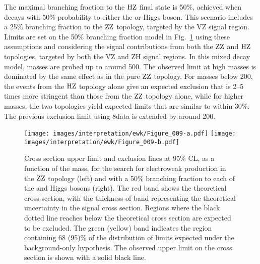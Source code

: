 The maximal branching fraction to the $\mathrm{H}\mathrm{Z}$ final state is 50\%, achieved when \firstchi decays with 50\% probability to either the \PZ or Higgs boson.
This scenario includes a 25\% branching fraction to the $\mathrm{Z}\mathrm{Z}$ topology, targeted by the VZ signal region.
Limits are set on the 50\% branching fraction model in Fig.~\ref{fig:LimitTChiZZHZ} using these assumptions and considering the signal contributions from both the $\mathrm{Z}\mathrm{Z}$ and $\mathrm{H}\mathrm{Z}$ topologies, targeted by both the VZ and ZH signal regions.
In this mixed decay model, \firstchi masses are probed up to around 500\GeV.
The observed limit at high masses is dominated by the same effect as in the pure $\mathrm{Z}\mathrm{Z}$ topology.
For masses below 200\GeV, the events from the $\mathrm{H}\mathrm{Z}$ topology alone give an expected exclusion that is 2--5 times more stringent than those from the $\mathrm{Z}\mathrm{Z}$ topology alone, while for higher masses, the two topologies yield expected limits that are similar to within 30\%.
The previous exclusion limit using 8\TeV data is extended by around 200\GeV.
\begin{figure}
\centering
\texttt{[image: images/interpretation/ewk/Figure\_009-a.pdf]}
\texttt{[image: images/interpretation/ewk/Figure\_009-b.pdf]}
\caption{Cross section upper limit and exclusion lines at 95\% CL, as a function of the \firstchi mass, for the search for electroweak production in the $\mathrm{Z}\mathrm{Z}$ topology (left)
  and with a 50\% branching fraction to each of the \PZ and Higgs bosons (right).
The red band shows the theoretical cross section, with the thickness of band representing the theoretical uncertainty in the signal cross section.
Regions where the black dotted line reaches below the theoretical cross section are expected to be excluded.
The green (yellow) band indicates the region containing 68 (95)\% of the distribution of limits expected under the background-only hypothesis.
The observed upper limit on the cross section is shown with a solid black line.
}
\label{fig:LimitTChiZZHZ}
\end{figure}
